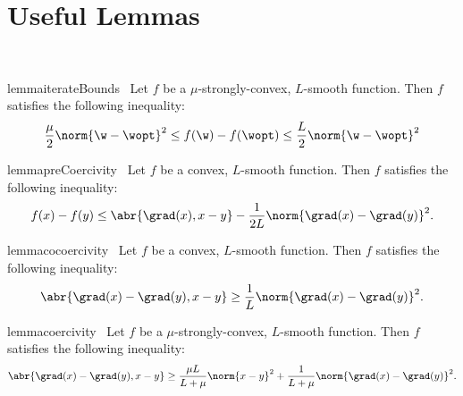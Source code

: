 
\section{Useful Lemmas}~\label{app:useful-lemmas}

\begin{restatable}{lemma}{iterateBounds}~\label{lemma:iterate-bounds}
    Let \( f \) be a \( \mu \)-strongly-convex, \( L \)-smooth function. 
    Then \( f \) satisfies the following inequality:
    \[ \frac{\mu}{2}\norm{\w - \wopt}^2 \leq f(\w) - f(\wopt) \leq \frac{L}{2}\norm{\w - \wopt}^2 \]
\end{restatable}


\begin{restatable}{lemma}{preCoercivity}~\label{lemma:pre-coercivity}
    Let \( f  \) be a convex, \( L  \)-smooth function. 
    Then \( f  \) satisfies the following inequality:
    \[ f(x) - f(y)  \leq  \abr{\grad(x), x - y}- \frac{1}{2L} \norm{\grad(x) - \grad(y)}^2. \] 
\end{restatable}


\begin{restatable}{lemma}{cocoercivity}~\label{lemma:co-coercivity}
    Let \( f  \) be a convex, \( L  \)-smooth function. 
    Then \( f  \) satisfies the following inequality:
    \[ \abr{\grad(x) - \grad(y), x - y} \geq \frac{1}{L} \norm{\grad(x) - \grad(y)}^2. \] 
\end{restatable}


\begin{restatable}{lemma}{coercivity}~\label{lemma:coercivity}
    Let \( f  \) be a \( \mu  \)-strongly-convex, \( L  \)-smooth function. 
    Then \( f  \) satisfies the following inequality:
    \[ \abr{\grad(x) - \grad(y), x - y} \geq \frac{\mu L}{L + \mu}\norm{x - y}^2 + \frac{1}{L + \mu} \norm{\grad(x) - \grad(y)}^2.  \] 
\end{restatable}

